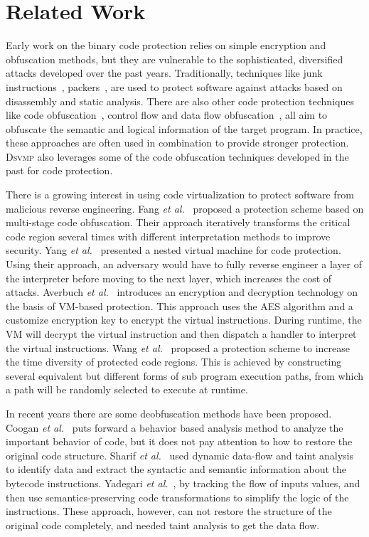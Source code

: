 \documentclass[preprint,12pt,3p]{elsarticle}
\newcommand{\DSVMP}{\textsc{Dsvmp}\xspace}
\begin{document}
\section{Related Work}\label{sec:work}
Early work on the binary code protection relies on simple encryption and obfuscation methods,
but they are vulnerable to the sophisticated, diversified attacks developed over the past years.
Traditionally, techniques like junk instructions~\cite{23linn2003obfuscation}, packers~\cite{25Execryptor,26upx},
are used to protect software against attacks based on disassembly and static analysis.
There are also other code protection techniques like code obfuscation~\cite{25wu2010mimimorphism},
control flow and data flow obfuscation~\cite{13liem2008compiler,27ge2005control,27balachandran2014function},
all aim to obfuscate the semantic and logical information of the target program.
In practice, these approaches are often used in combination to provide stronger protection.
\DSVMP also leverages some of the code obfuscation techniques developed in the past for code protection.

There is a growing interest in using code virtualization to protect software from malicious reverse engineering.
Fang \emph{et al.}~\cite{5fang2011multi} proposed a protection scheme based on multi-stage code obfuscation.
Their approach iteratively transforms the critical code region several times with different interpretation methods to improve security.
Yang \emph{et al.}~\cite{6ming2011software} presented a nested virtual machine for code protection.
Using their approach, an adversary would have to fully reverse engineer a layer of the interpreter before moving to the next layer,
which increases the cost of attacks.
Averbuch \emph{et al.}~\cite{27averbuch2011efficient} introduces an encryption and decryption technology
on the basis of VM-based protection. This approach uses the AES algorithm and a customize encryption key
to encrypt the virtual instructions. During runtime, the VM will decrypt the virtual instruction and then
dispatch a handler to interpret the virtual instructions.
Wang \emph{et al.}~\cite{7wang2014tdvmp} proposed a protection scheme to increase the time diversity of protected code regions.
This is achieved by constructing several equivalent but different forms of sub program execution paths,
from which a path will be randomly selected to execute at runtime.

In recent years there are some deobfuscation methods have been proposed.
Coogan \emph{et al.}~\cite{coogan2011deobfuscation} puts forward a behavior based analysis method to analyze the important behavior of code, but it does not pay attention to how to restore the original code structure.
Sharif \emph{et al.}~\cite{sharif2009automatic} used dynamic data-flow and taint analysis to identify data and extract the syntactic and semantic information about the bytecode instructions.
Yadegari \emph{et al.}~\cite{Yadegari2015A}, by tracking the flow of inputs values, and then use semantics-preserving code transformations to simplify the logic of the instructions.
These approach, however, can not restore the structure of the original code completely, and needed taint analysis to get the data flow.
\end{document}
